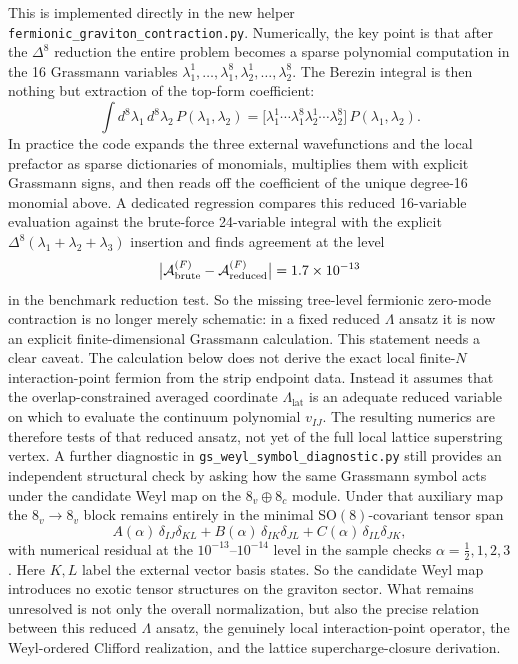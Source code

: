 \documentclass[11pt]{article}
\numberwithin{equation}{section}
\begin{document}
This is implemented directly in the new helper \texttt{fermionic\_graviton\_contraction.py}. Numerically, the key point is that after the $\Delta^8$ reduction the entire problem becomes a sparse polynomial computation in the 16 Grassmann variables
\(
\lambda_1^1,\dots,\lambda_1^8,\lambda_2^1,\dots,\lambda_2^8
\).
The Berezin integral is then nothing but extraction of the top-form coefficient:
\begin{equation}
\label{eq:s15-1-009d}
\int d^8\lambda_1\,d^8\lambda_2\,
P(\lambda_1,\lambda_2)
=
\bigl[\lambda_1^1\cdots\lambda_1^8\lambda_2^1\cdots\lambda_2^8\bigr]\,
P(\lambda_1,\lambda_2).
\end{equation}
In practice the code expands the three external wavefunctions and the local prefactor as sparse dictionaries of monomials, multiplies them with explicit Grassmann signs, and then reads off the coefficient of the unique degree-16 monomial above. A dedicated regression compares this reduced 16-variable evaluation against the brute-force 24-variable integral with the explicit $\Delta^8(\lambda_1+\lambda_2+\lambda_3)$ insertion and finds agreement at the level
\begin{equation}
\label{eq:s15-1-009e}
\bigl|{\cal A}^{(F)}_{\rm brute}-{\cal A}^{(F)}_{\rm reduced}\bigr|
=1.7\times 10^{-13}
\end{equation}
in the benchmark reduction test. So the missing tree-level fermionic zero-mode contraction is no longer merely schematic: in a fixed reduced $\Lambda$ ansatz it is now an explicit finite-dimensional Grassmann calculation. This statement needs a clear caveat. The calculation below does not derive the exact local finite-$N$ interaction-point fermion from the strip endpoint data. Instead it assumes that the overlap-constrained averaged coordinate $\Lambda_{\mathrm{lat}}$ is an adequate reduced variable on which to evaluate the continuum polynomial $v_{IJ}$. The resulting numerics are therefore tests of that reduced ansatz, not yet of the full local lattice superstring vertex. A further diagnostic in \texttt{gs\_weyl\_symbol\_diagnostic.py} still provides an independent structural check by asking how the same Grassmann symbol acts under the candidate Weyl map on the $8_v\oplus 8_c$ module. Under that auxiliary map the $8_v\to 8_v$ block remains entirely in the minimal SO$(8)$-covariant tensor span
\begin{equation}
\label{eq:s15-1-010}
A(\alpha)\,\delta_{IJ}\delta_{KL}
{}+B(\alpha)\,\delta_{IK}\delta_{JL}
{}+C(\alpha)\,\delta_{IL}\delta_{JK},
\end{equation}
with numerical residual at the $10^{-13}$--$10^{-14}$ level in the sample checks $\alpha=\frac12,1,2,3$. Here $K,L$ label the external vector basis states. So the candidate Weyl map introduces no exotic tensor structures on the graviton sector. What remains unresolved is not only the overall normalization, but also the precise relation between this reduced $\Lambda$ ansatz, the genuinely local interaction-point operator, the Weyl-ordered Clifford realization, and the lattice supercharge-closure derivation.
\end{document}
